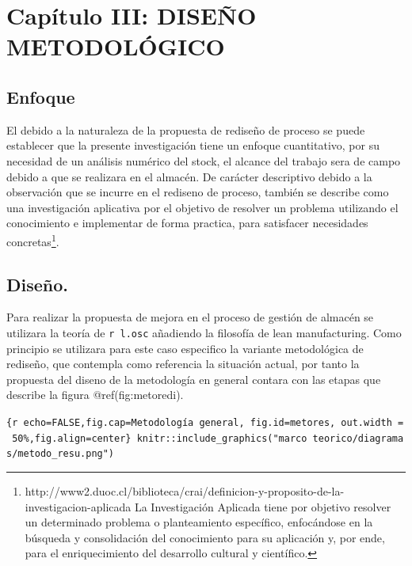 \documentclass[11pt]{article}
\begin{document}
\newpage

\hypertarget{capuxedtulo-iii-diseuxf1o-metodoluxf3gico}{%
\section{Capítulo III: DISEÑO
METODOLÓGICO}\label{capuxedtulo-iii-diseuxf1o-metodoluxf3gico}}

\hypertarget{enfoque}{%
\subsection{Enfoque}\label{enfoque}}

El debido a la naturaleza de la propuesta de rediseño de proceso se
puede establecer que la presente investigación tiene un enfoque
cuantitativo, por su necesidad de un análisis numérico del stock, el
alcance del trabajo sera de campo debido a que se realizara en el
almacén. De carácter descriptivo debido a la observación que se incurre
en el rediseno de proceso, también se describe como una investigación
aplicativa por el objetivo de resolver un problema utilizando el
conocimiento e implementar de forma practica, para satisfacer
necesidades concretas\footnote{http://www2.duoc.cl/biblioteca/crai/definicion-y-proposito-de-la-investigacion-aplicada
  La Investigación Aplicada tiene por objetivo resolver un determinado
  problema o planteamiento específico, enfocándose en la búsqueda y
  consolidación del conocimiento para su aplicación y, por ende, para el
  enriquecimiento del desarrollo cultural y científico.}.

\hypertarget{diseuxf1o.}{%
\subsection{Diseño.}\label{diseuxf1o.}}

Para realizar la propuesta de mejora en el proceso de gestión de almacén
se utilizara la teoría de \texttt{r\ l.osc} añadiendo la filosofía de
lean manufacturing. Como principio se utilizara para este caso
especifico la variante metodológica de rediseño, que contempla como
referencia la situación actual, por tanto la propuesta del diseno de la
metodología en general contara con las etapas que describe la figura
@ref(fig:metoredi).

\texttt{\{r\ echo=FALSE,fig.cap=\textquotesingle{}Metodología\ general\textquotesingle{},\ fig.id=\textquotesingle{}metores\textquotesingle{},\ out.width\ =\ \textquotesingle{}50\%\textquotesingle{},fig.align=\textquotesingle{}center\textquotesingle{}\}\ knitr::include\_graphics("marco\ teorico/diagramas/metodo\_resu.png")}
\end{document}
